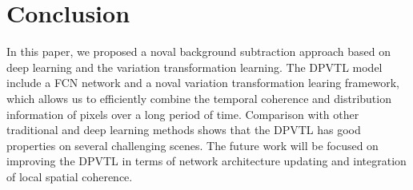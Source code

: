 \documentclass[journal]{IEEEtran}
\begin{document}
\section{Conclusion}
\label{sec6}
In this paper, we proposed a noval background subtraction approach based on deep learning and the variation transformation learning. The DPVTL model include a FCN network and a noval variation transformation learing framework, which allows us to efficiently combine the temporal coherence and distribution information of pixels over a long period of time. Comparison with other traditional and deep learning methods shows that the DPVTL has good properties on several challenging scenes.
The future work will be focused on improving the DPVTL in terms of network architecture updating and integration of local spatial coherence.

% 
\ifCLASSOPTIONcaptionsoff
  \newpage
\fi

  
  
\end{document}
